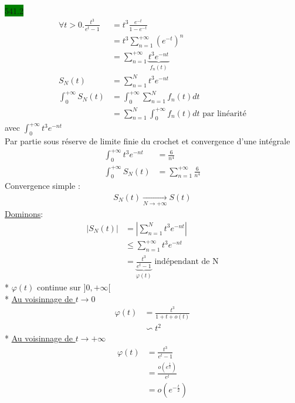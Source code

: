 \documentclass{article}
\begin{document}
\noindent \colorbox{green}{541.2}\\
\begin{align*}
  \forall t > 0. \frac{t^{3}}{e^{t}-1}&= t^{3}\frac{e^{-t}}{1-e^{-t}}\\ 
                                      &= t^{3}\sum_{n=1}^{+\infty}(e^{-t})^{n}\\
                                      &= \sum_{n=1}^{+\infty}\underbrace{t^{3}e^{-nt}}_{f_{n}(t)}\\ 
  S_{N}(t) &= \sum_{n=1}^{N}t^{3}e^{-nt}\\ 
  \int_{0}^{+\infty}S_{N}(t) &= \int_{0}^{+\infty}\sum_{n=1}^{N}f_{n}(t)dt \\ 
                             &= \sum_{n=1}^{N}\int_{0}^{+\infty}f_{n}(t)dt \text{ par linéarité}
\end{align*}
avec \(\int_{0}^{+\infty}t^{3}e^{-nt}\)\\
Par partie sous réserve de limite finie du crochet et convergence 
d'une intégrale 
\begin{align*}
  \int_{0}^{+\infty} t^{3}e^{-nt} &= \frac{6}{n^{4}}\\
  \int_{0}^{+\infty}S_{N}(t)  &= \sum_{n=1}^{+\infty}\frac{6}{n^{4}}
\end{align*}
Convergence simple : 
\begin{align*}
  S_{N}(t)\xrightarrow[N \rightarrow +\infty]{} S(t)
\end{align*}
\underline{Dominons}: 
\begin{align*}
  |S_{N}(t)| &= |\sum_{n=1}^{N}t^{3}e^{-nt}|\\
             &\leq \sum_{n=1}^{+\infty}t^{3}e^{-nt}\\ 
             &= \underbrace{\frac{t^{3}}{e^{t}-1}}_{\varphi(t)} \text{ indépendant de N}
\end{align*}
* \(\varphi(t)\) continue sur \(]0, +\infty[\)\\
* \underline{Au voisinnage de \(t \to 0\)}\\
\begin{align*}
  \varphi(t) &= \frac{t^{3}}{1+t+o(t)}\\
             &\backsim t^{2}
\end{align*}
* \underline{Au voisinnage de \(t \rightarrow +\infty\)}\\
\begin{align*}
  \varphi(t) &= \frac{t^{3}}{e^{t}-1}\\ 
             &= \frac{o(e^{\frac{t}{2}})}{e^{t}}\\
             &= o(e^{-\frac{t}{2}})
\end{align*}
\end{document}
